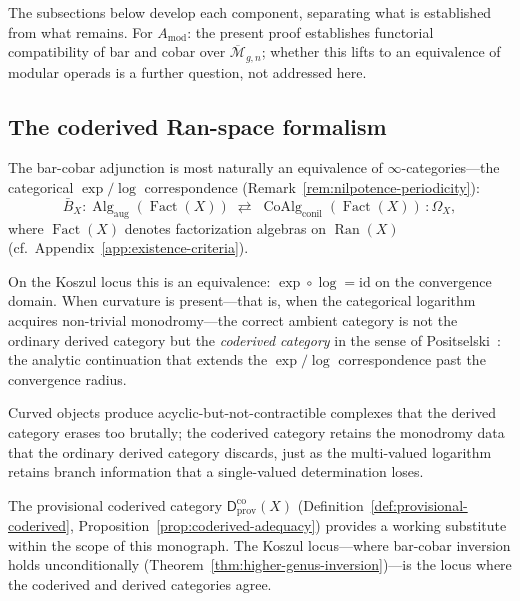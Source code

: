 \noindent
The subsections below develop each component, separating what is
established from what remains.  For $A_{\mathrm{mod}}$: the present
proof establishes functorial compatibility of bar and cobar over
$\overline{\mathcal{M}}_{g,n}$; whether this lifts to an equivalence
of modular operads is a further question, not addressed here.

\medskip

\subsection{The coderived Ran-space formalism}
\label{subsec:coderived-ran}

The bar-cobar adjunction is most naturally an equivalence of
$\infty$-categories---the categorical $\exp/\log$ correspondence
(Remark~\ref{rem:nilpotence-periodicity}):
\[
\bar{B}_X \colon
\operatorname{Alg}_{\mathrm{aug}}(\operatorname{Fact}(X))
\;\rightleftarrows\;
\operatorname{CoAlg}_{\mathrm{conil}}(\operatorname{Fact}(X))
\,:\!\Omega_X,
\]
where $\operatorname{Fact}(X)$ denotes factorization algebras on
$\operatorname{Ran}(X)$ (cf.\ Appendix~\ref{app:existence-criteria}).

On the Koszul locus this is an equivalence: $\exp \circ \log = \mathrm{id}$
on the convergence domain.  When curvature is present---that is,
when the categorical logarithm acquires non-trivial monodromy---the
correct ambient category is not the ordinary derived category but the
\emph{coderived category} in the sense of
Positselski~\cite{Positselski11}: the analytic continuation that
extends the $\exp/\log$ correspondence past the convergence radius.

Curved objects produce acyclic-but-not-contractible complexes that the
derived category erases too brutally; the coderived category retains
the monodromy data that the ordinary derived category discards, just
as the multi-valued logarithm retains branch information that a
single-valued determination loses.

The provisional coderived category
$\mathsf{D}^{\mathrm{co}}_{\mathrm{prov}}(X)$
(Definition~\ref{def:provisional-coderived},
Proposition~\ref{prop:coderived-adequacy})
provides a working substitute within the scope of this monograph.
The Koszul locus---where bar-cobar inversion
holds unconditionally (Theorem~\ref{thm:higher-genus-inversion})---is
the locus where the coderived and derived categories agree.

